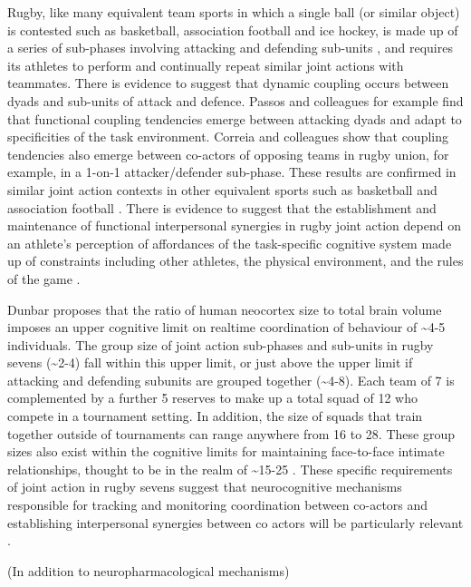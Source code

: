   Rugby, like many equivalent team sports in which a single ball (or similar object) is contested such as basketball, association football and ice hockey, is made up of a series of sub-phases involving attacking and defending sub-units \citep{Passos2011}, and requires its athletes to perform and continually repeat similar joint actions with teammates. There is evidence to suggest that dynamic coupling occurs between dyads and sub-units of attack and defence\citep{Passos2011,Correia2014}.  Passos and colleagues \textcite{Passos2011} for example find that functional coupling tendencies emerge between attacking dyads and adapt to specificities of the task environment.  Correia and colleagues \textcite{Correia2014} show that coupling tendencies also emerge between co-actors of opposing teams in rugby union, for example, in a 1-on-1 attacker/defender sub-phase.  These results are confirmed in similar joint action contexts in other equivalent sports such as basketball and association football \citep{Duarte2013}. There is evidence to suggest that the establishment and maintenance of functional  interpersonal synergies in rugby joint action depend on an athlete's perception of affordances of the task-specific cognitive system made up of constraints including other athletes, the physical environment, and the rules of the game \citep{Passos2012}.

  Dunbar \textcite{Dunbar1992} proposes that the ratio of human neocortex size to total brain volume imposes an upper cognitive limit on realtime coordination of behaviour of \sim4-5 individuals.  The group size of joint action sub-phases and sub-units in rugby sevens (\sim2-4) fall within this upper limit, or just above the upper limit if attacking and defending subunits are grouped together (\sim4-8).  Each team of 7 is complemented by a further 5 reserves to make up a total squad of 12 who compete in a tournament setting.  In addition, the size of squads that train together outside of tournaments can range anywhere from 16 to 28.
  These group sizes also exist within the cognitive limits for maintaining face-to-face intimate relationships, thought to be in the realm of \sim15-25 \citep{Dunbar1992,Dunbar2010}. These specific requirements of joint action in rugby sevens suggest that neurocognitive mechanisms responsible for tracking and monitoring coordination between co-actors and establishing interpersonal synergies between co actors will be particularly relevant \citep{Mogan2017}.

  (In addition to neuropharmacological mechanisms)


